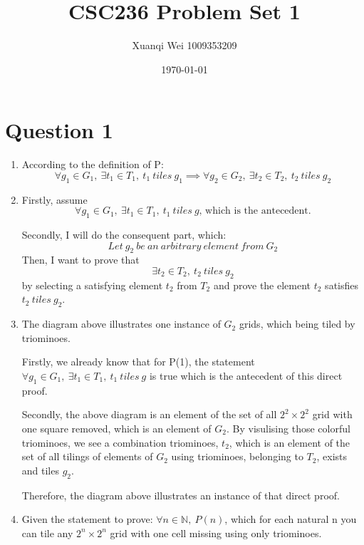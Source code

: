 \documentclass[12pt]{article}
\title{CSC236 Problem Set 1}
\author{Xuanqi Wei 1009353209}
\date{\today}
\begin{document}




\setcounter{page}{1}

\section{Question 1}
\begin{enumerate}[label=(\alph*)]
    \item According to the definition of P:
    $$\forall g_1 \in G_1,\ \exists t_1 \in T_1,\ t_1\ tiles\ g_1 \implies \forall g_2 \in G_2,\ \exists t_2 \in T_2,\ t_2\ tiles\ g_2 $$

    \item 
    Firstly, assume $$\forall g_1 \in G_1,\ \exists t_1 \in T_1,\ t_1\ tiles\ g\text{, which is the antecedent.}$$
    
    Secondly, I will do the consequent part, which: $$Let\ g_2\ be\ an\ arbitrary\ element\ from\ G_2$$ 
    Then, I want to prove that $$\exists t_2 \in T_2,\ t_2\ tiles\ g_2$$ \quad \quad \quad \quad \quad \quad \quad by selecting a satisfying element $t_2$ from $T_2$ 
    and prove the element $t_2$ satisfies $t_2\ tiles\ g_2$.

    \item The diagram above illustrates one instance of $G_2$ grids, which being tiled by triominoes.
    
    Firstly, we already know that for P(1), the statement $\forall g_1 \in G_1,\ \exists t_1 \in T_1,\ t_1\ tiles\ g$ is true which is the antecedent of this direct proof.

    Secondly, the above diagram is an element of the set of all $2^2 \times 2^2$ grid with one square removed, which is an element of $G_2$. 
    By visulising those colorful triominoes, we see a combination triominoes, $t_2$, which is an element of the set of all tilings of elements of $G_2$ using triominoes, belonging to $T_2$, exists and tiles $g_2$.

    Therefore, the diagram above illustrates an instance of that direct proof.

    \item Given the statement to prove: $\forall n \in \mathbb{N},\ P(n)$, which for each natural n you can tile any $2^n \times 2^n$ grid with one cell missing using only triominoes.
    

\end{enumerate}
\end{document}
